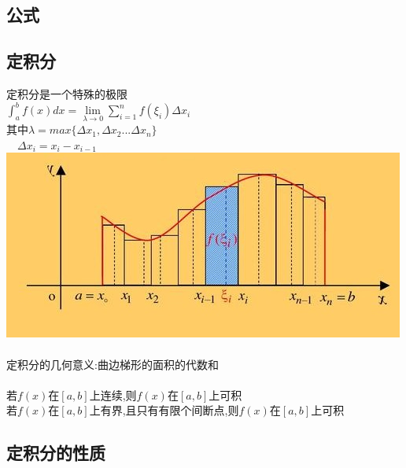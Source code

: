 \documentclass{article}
\begin{document}
\begin{flushleft}
	\huge
	
	\section{公式}
	
	\subsection{定积分}
	
	定积分是一个特殊的极限\\
	$\int_{a}^{b}f(x)dx=\lim\limits_{\lambda\to 0}\sum_{i=1}^{n}f(\xi_i)\Delta x_i$\\
	其中$\lambda = max\{\Delta x_1, \Delta x_2...\Delta x_n\}$\\
	\ \ $\Delta x_i=x_i-x_{i-1}$\\
	\includegraphics[scale=1.0]{2.jpg}\\
	~\\
	定积分的几何意义:曲边梯形的面积的代数和\\
	~\\
	若$f(x)$在$[a,b]$上连续,则$f(x)$在$[a,b]$上可积\\
	若$f(x)$在$[a,b]$上有界,且只有有限个间断点,则$f(x)$在$[a,b]$上可积\\
	
	\subsection{定积分的性质}
	

\end{flushleft}
\end{document}
